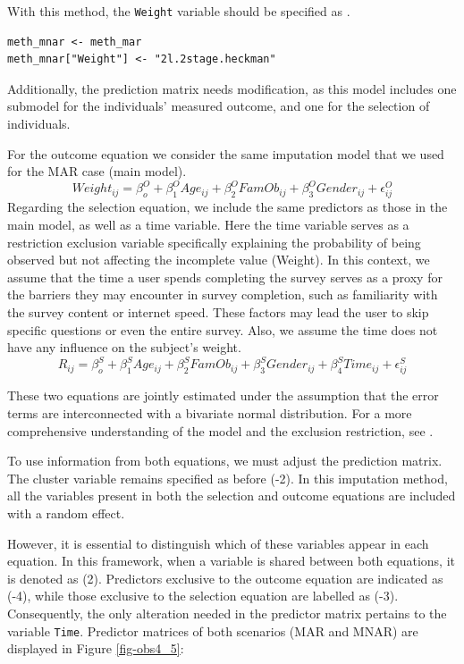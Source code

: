 \documentclass[
  article]{jss}
\begin{document}
With this method, the \texttt{Weight} variable should be specified as
.

\begin{verbatim}
meth_mnar <- meth_mar
meth_mnar["Weight"] <- "2l.2stage.heckman"
\end{verbatim}

Additionally, the prediction matrix needs modification, as this model
includes one submodel for the individuals' measured outcome, and one for
the selection of individuals.

For the outcome equation we consider the same imputation model that we
used for the MAR case (main model).
\[Weight_{ij}= \beta^O_{o} + \beta^O_{1}Age_{ij} + \beta^O_{2}FamOb_{ij}+ \beta^O_{3}Gender_{ij} + \epsilon^O_{ij}\]
Regarding the selection equation, we include the same predictors as
those in the main model, as well as a time variable. Here the time
variable serves as a restriction exclusion variable specifically
explaining the probability of being observed but not affecting the
incomplete value (Weight). In this context, we assume that the time a
user spends completing the survey serves as a proxy for the barriers
they may encounter in survey completion, such as familiarity with the
survey content or internet speed. These factors may lead the user to
skip specific questions or even the entire survey. Also, we assume the
time does not have any influence on the subject's weight.
\[R_{ij}= \beta^S_{o} + \beta^S_{1}Age_{ij} + \beta^S_{2}FamOb_{ij}+ \beta^S_{3}Gender_{ij} +\beta^S_{4}Time_{ij}+ \epsilon^S_{ij}\]

These two equations are jointly estimated under the assumption that the
error terms are interconnected with a bivariate normal distribution. For
a more comprehensive understanding of the model and the exclusion
restriction, see \citep{munoz2023}.

To use information from both equations, we must adjust the prediction
matrix. The cluster variable remains specified as before (-2). In this
imputation method, all the variables present in both the selection and
outcome equations are included with a random effect.

However, it is essential to distinguish which of these variables appear
in each equation. In this framework, when a variable is shared between
both equations, it is denoted as (2). Predictors exclusive to the
outcome equation are indicated as (-4), while those exclusive to the
selection equation are labelled as (-3). Consequently, the only
alteration needed in the predictor matrix pertains to the variable
\texttt{Time}. Predictor matrices of both scenarios (MAR and MNAR) are
displayed in Figure \ref{fig-obs4_5}:
\end{document}
